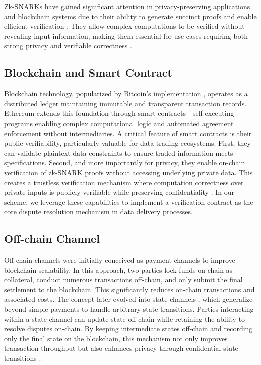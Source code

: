 \documentclass[journal]{IEEEtran}
\begin{document}
Zk-SNARKs have gained significant attention in privacy-preserving applications and blockchain systems due to their ability to generate succinct proofs and enable efficient verification \cite{sasson2014zerocash}. They allow complex computations to be verified without revealing input information, making them essential for use cases requiring both strong privacy and verifiable correctness \cite{kosba2016hawk}.



\subsection{Blockchain and Smart Contract}
Blockchain technology, popularized by Bitcoin's implementation \cite{nakamoto2008bitcoin}, operates as a distributed ledger maintaining immutable and transparent transaction records. Ethereum \cite{buterin2013ethereum} extends this foundation through smart contracts—self-executing programs enabling complex computational logic and automated agreement enforcement without intermediaries. A critical feature of smart contracts is their public verifiability, particularly valuable for data trading ecosystems. First, they can validate plaintext data constraints to ensure traded information meets specifications. Second, and more importantly for privacy, they enable on-chain verification of zk-SNARK proofs without accessing underlying private data. This creates a trustless verification mechanism where computation correctness over private inputs is publicly verifiable while preserving confidentiality \cite{wan2022zk}. In our scheme, we leverage these capabilities to implement a verification contract as the core dispute resolution mechanism in data delivery processes.


\subsection{Off-chain Channel}\label{subsec:off_chain_channel}
Off-chain channels were initially conceived as payment channels \cite{poon2016bitcoin} to improve blockchain scalability. In this approach, two parties lock funds on-chain as collateral, conduct numerous transactions off-chain, and only submit the final settlement to the blockchain. This significantly reduces on-chain transactions and associated costs. The concept later evolved into state channels \cite{dziembowski2018general}, which generalize beyond simple payments to handle arbitrary state transitions. Parties interacting within a state channel can update state off-chain while retaining the ability to resolve disputes on-chain. By keeping intermediate states off-chain and recording only the final state on the blockchain, this mechanism not only improves transaction throughput but also enhances privacy through confidential state transitions \cite{qin2023blindhub}.
\end{document}
